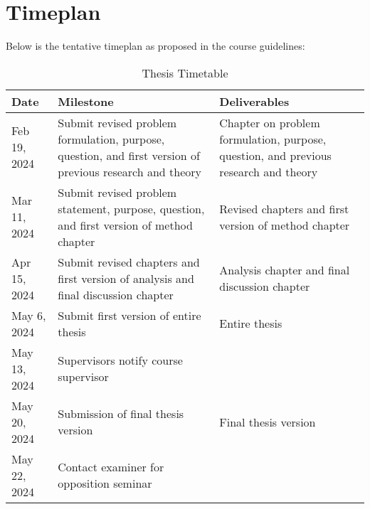 \chapter{Timeplan}

Below is the tentative timeplan as proposed in the course guidelines:


\begin{table}[h]
\centering

\begin{tabularx}{\textwidth}{|l|X|X|}
\hline
\textbf{Date}         & \textbf{Milestone}                                          & \textbf{Deliverables}                                 \\ \hline
Feb 19, 2024          & Submit revised problem formulation, purpose, question, and first version of previous research and theory & Chapter on problem formulation, purpose, question, and previous research and theory \\ \hline
Mar 11, 2024          & Submit revised problem statement, purpose, question, and first version of method chapter                     & Revised chapters and first version of method chapter  \\ \hline
Apr 15, 2024          & Submit revised chapters and first version of analysis and final discussion chapter                           & Analysis chapter and final discussion chapter         \\ \hline
May 6, 2024           & Submit first version of entire thesis                                                                & Entire thesis                                         \\ \hline
May 13, 2024          & Supervisors notify course supervisor                                                     &                                                      \\ \hline
May 20, 2024          & Submission of final thesis version                                                      & Final thesis version                                  \\ \hline
May 22, 2024          & Contact examiner for opposition seminar                                                  &                                                      \\ \hline
\end{tabularx}

\caption{Thesis Timetable}
\label{tab:thesis_timetable}
\end{table}


